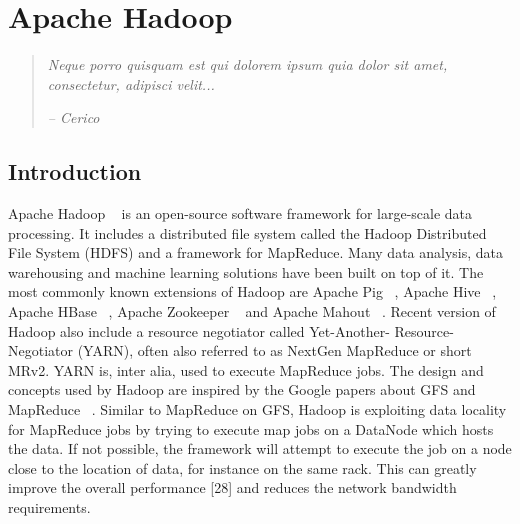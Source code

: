 
%
%
%


\chapter{Apache Hadoop}
\label{ch:hadoop}

\begin{quotation}
  {\small\it Neque porro quisquam est qui dolorem ipsum quia dolor sit amet, consectetur, adipisci velit...}

{\small\it -- Cerico}
\end{quotation}




\section{Introduction}

Apache Hadoop ~\cite{h17} is an open-source software framework for large-scale data
processing. It includes a distributed file system called the Hadoop Distributed
File System (HDFS) and a framework for MapReduce. Many data analysis,
data warehousing and machine learning solutions have been built on top of it.
The most commonly known extensions of Hadoop are Apache Pig ~\cite{21}, Apache
Hive ~\cite{22}, Apache HBase  ~\cite{26}, Apache Zookeeper  ~\cite{27} and Apache Mahout  ~\cite{23}.
Recent version of Hadoop also include a resource negotiator called Yet-Another-
Resource-Negotiator (YARN), often also referred to as NextGen MapReduce or
short MRv2. YARN is, inter alia, used to execute MapReduce jobs. The design
and concepts used by Hadoop are inspired by the Google papers about GFS and
MapReduce ~\cite[p.~9]{h17}. Similar to MapReduce on GFS, Hadoop is exploiting data
locality for MapReduce jobs by trying to execute map jobs on a DataNode which
hosts the data. If not possible, the framework will attempt to execute the job
on a node close to the location of data, for instance on the same rack. This can
greatly improve the overall performance [28] and reduces the network bandwidth
requirements.



